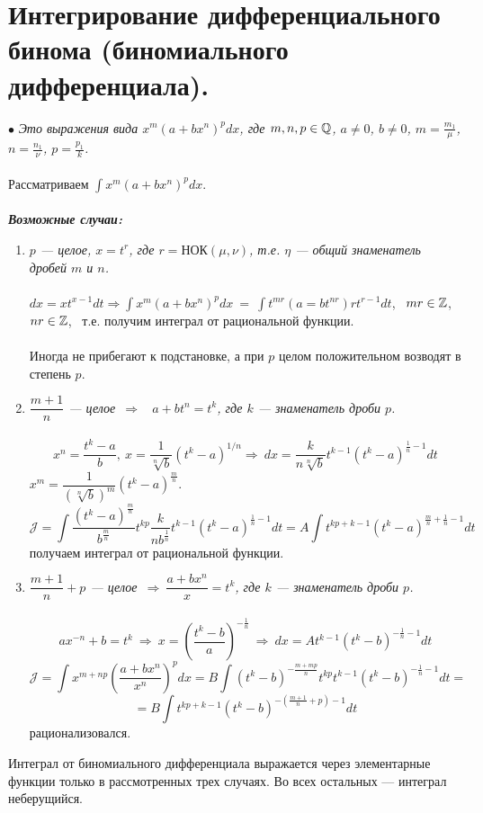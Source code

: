 \section{Интегрирование дифференциального бинома (биномиального дифференциала).}
$\bullet$ \textit{Это выражения вида $x^m(a+bx^n)^p d x$, где $m, n, p \in \mathbb{Q}$, $a \neq 0$, $b \neq 0$, $m = \frac{m_1}{\mu}$, $n = \frac{ n_1}{\nu}$, $p= \frac{p_1}{k}$.}\\\\
Рассматриваем $\int x^m(a+bx^n)^p d x$.\\\\
\textit{\textbf{Возможные случаи:}}
\begin{enumerate}
	\item \textit{ $p$ --- целое,  $x=t^r$, где $r =  \text{НОК} (\mu,\nu)$, т.е. $\eta$ --- общий знаменатель дробей $m$ и $n$.}\\\\
	$dx=xt^{x-1}dt \Rightarrow \int x^m(a+bx^n)^p d x \ =\ \int t^{mr }(a=bt^{nr})r t^{r - 1} d t$, \ $mr \in \mathbb{Z}$, $nr \in \mathbb{Z}$, \ т.е. получим интеграл от рациональной функции.\\\\
	Иногда не прибегают к подстановке, а при $p$ целом положительном возводят в степень $p$.
	\item \textit{ $\dfrac{m+1}{n}$ --- целое\ $\Rightarrow$ \ $a+bt^n = t^k$, где $k$ --- знаменатель дроби $p$. }\\\\
	$$x^n=\frac{t^k-a}{b},\ x=\frac{1}{\sqrt[n]{b}}(t^k-a)^{1/n} \Rightarrow \ dx = \frac{k}{n\sqrt[n]{b}} t^{k-1} (t^k-a)^{\frac{1}{n}-1} dt$$
	$x^m =\dfrac{1}{(\sqrt[n]{b})^m}(t^k-a)^{\frac{m}{n}}$.
	$$\mathcal{J}= \int \frac{(t^k-a)^{\frac{m}{n}}}{b^{\frac{m}{n}}} t^{kp} \frac{k}{nb^{\frac{1}{n}}} t^{k-1} (t^k-a)^{\frac{1}{n} -1} dt = A \int t^{kp+k-1} (t^k-a)^{\frac{m}{n}+\frac{1}{n} -1} dt$$ получаем интеграл от рациональной функции.
	\item \textit{ $\dfrac{m+1}{n}+p$ --- целое\ $\Rightarrow \  \dfrac{a+bx^n}{x}  = t^k$, где $k$ --- знаменатель дроби $p$. }\\\\
	$$ax^{-n}+b = t^k \ \Rightarrow \ x = (\frac{t^k-b}{a})^{-\frac{1}{n}}\ \Rightarrow \ dx = A t^{k-1}(t^k-b)^{-\frac{1}{n}-1}dt $$
	$$\mathcal{J}= \int x^{m + np} (\frac{a+bx^n}{x^n})^p dx = B \int (t^k -b)^{-\frac{m+mp}{n}} t^{kp} t^{k-1} (t^k - b)^{-\frac{1}{n}-1} dt =$$ $$= B \int t^{kp+k-1} (t^k-b)^{-(\frac{m+1}{n}+p)-1} dt$$ рационализовался.
\end{enumerate}
\begin{theorem}[Чебышева]
	Интеграл от биномиального дифференциала выражается через элементарные функции только в рассмотренных трех случаях. Во всех  остальных --- интеграл неберущийся.
\end{theorem}

